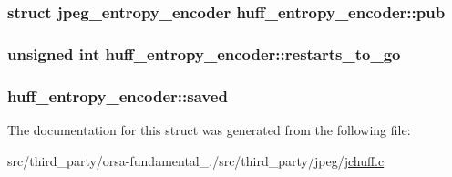 \subsubsection[{pub}]{\setlength{\rightskip}{0pt plus 5cm}struct {\bf jpeg\+\_\+entropy\+\_\+encoder} huff\+\_\+entropy\+\_\+encoder\+::pub}\label{structhuff__entropy__encoder_a1a7606509ffbd9efd4c611af433879e0}
\hypertarget{structhuff__entropy__encoder_a6c999079a14022f2610081d420c36513}{}
\subsubsection[{restarts\+\_\+to\+\_\+go}]{\setlength{\rightskip}{0pt plus 5cm}unsigned int huff\+\_\+entropy\+\_\+encoder\+::restarts\+\_\+to\+\_\+go}\label{structhuff__entropy__encoder_a6c999079a14022f2610081d420c36513}
\hypertarget{structhuff__entropy__encoder_ac27e136d5c3baca34bafde2053d91ad0}{}
\subsubsection[{saved}]{ huff\+\_\+entropy\+\_\+encoder\+::saved}\label{structhuff__entropy__encoder_ac27e136d5c3baca34bafde2053d91ad0}


The documentation for this struct was generated from the following file\+:\begin{DoxyCompactItemize}
\item 
src/third\+\_\+party/orsa-\/fundamental\+\_./src/third\+\_\+party/jpeg/\hyperlink{jchuff_8c}{jchuff.\+c}\end{DoxyCompactItemize}
